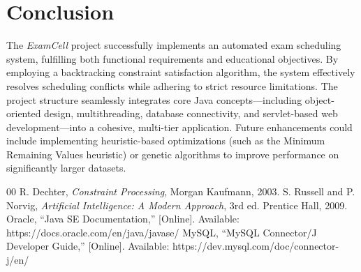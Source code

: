 \documentclass[conference]{IEEEtran}
\begin{document}
\section{Conclusion}
The \textit{ExamCell} project successfully implements an automated exam scheduling system, fulfilling both functional requirements and educational objectives. By employing a backtracking constraint satisfaction algorithm, the system effectively resolves scheduling conflicts while adhering to strict resource limitations. The project structure seamlessly integrates core Java concepts—including object-oriented design, multithreading, database connectivity, and servlet-based web development—into a cohesive, multi-tier application. Future enhancements could include implementing heuristic-based optimizations (such as the Minimum Remaining Values heuristic) or genetic algorithms to improve performance on significantly larger datasets.

\begin{thebibliography}{00}
 R. Dechter, \textit{Constraint Processing}, Morgan Kaufmann, 2003.
 S. Russell and P. Norvig, \textit{Artificial Intelligence: A Modern Approach}, 3rd ed. Prentice Hall, 2009.
 Oracle, ``Java SE Documentation,'' [Online]. Available: https://docs.oracle.com/en/java/javase/
 MySQL, ``MySQL Connector/J Developer Guide,'' [Online]. Available: https://dev.mysql.com/doc/connector-j/en/
\end{thebibliography}
\end{document}
